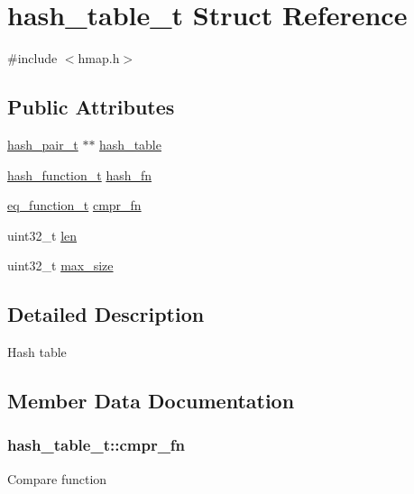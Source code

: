 \hypertarget{structhash__table__t}{}\section{hash\+\_\+table\+\_\+t Struct Reference}
\label{structhash__table__t}


{\ttfamily \#include $<$hmap.\+h$>$}

\subsection*{Public Attributes}
\begin{DoxyCompactItemize}
\item 
\hyperlink{structhash__pair__t}{hash\+\_\+pair\+\_\+t} $\ast$$\ast$ \hyperlink{structhash__table__t_af1f25086c6dca382a9b3762daa9c0d41}{hash\+\_\+table}
\item 
\hyperlink{funcops_8h_ac6c2c7464b9edfc43bfb8fff933350d9}{hash\+\_\+function\+\_\+t} \hyperlink{structhash__table__t_ae54423e7e3b478ef5c043f8249230240}{hash\+\_\+fn}
\item 
\hyperlink{funcops_8h_a155f33befac21aca576a3062abb121de}{eq\+\_\+function\+\_\+t} \hyperlink{structhash__table__t_a70febc3f68c3a3f123ca666cd1dda428}{cmpr\+\_\+fn}
\item 
uint32\+\_\+t \hyperlink{structhash__table__t_a9223de4b81823920a768881cb3dd57cf}{len}
\item 
uint32\+\_\+t \hyperlink{structhash__table__t_ad87cf56530f2815d1a0b52dfd8ffbc82}{max\+\_\+size}
\end{DoxyCompactItemize}


\subsection{Detailed Description}
Hash table 

\subsection{Member Data Documentation}
\hypertarget{structhash__table__t_a70febc3f68c3a3f123ca666cd1dda428}{}
\subsubsection[{cmpr\+\_\+fn}]{ hash\+\_\+table\+\_\+t\+::cmpr\+\_\+fn}\label{structhash__table__t_a70febc3f68c3a3f123ca666cd1dda428}
Compare function \hypertarget{structhash__table__t_ae54423e7e3b478ef5c043f8249230240}{}
